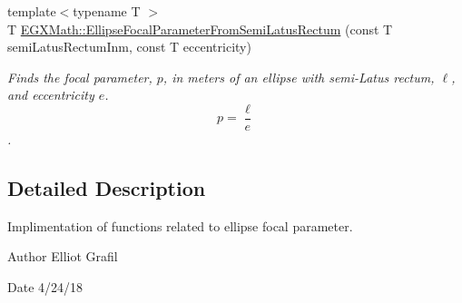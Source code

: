 \begin{DoxyCompactItemize}
{\footnotesize template$<$typename T $>$ }\\T \mbox{\hyperlink{group___e_g_x_math-_geometry-2_d-_ellipse-_focal_parameter_gaf957cf9131d3998bfe944f6234a133e6}{E\+G\+X\+Math\+::\+Ellipse\+Focal\+Parameter\+From\+Semi\+Latus\+Rectum}} (const T semi\+Latus\+Rectum\+Inm, const T eccentricity)
\begin{DoxyCompactList}\small\item\em Finds the focal parameter, $p$, in meters of an ellipse with semi-\/\+Latus rectum, $\ell$, and eccentricity $e$. \[ p=\frac{\ell}{e} \]. \end{DoxyCompactList}\end{DoxyCompactItemize}


\subsection{Detailed Description}
Implimentation of functions related to ellipse focal parameter. 

\begin{DoxyAuthor}{Author}
Elliot Grafil 
\end{DoxyAuthor}
\begin{DoxyDate}{Date}
4/24/18 
\end{DoxyDate}
